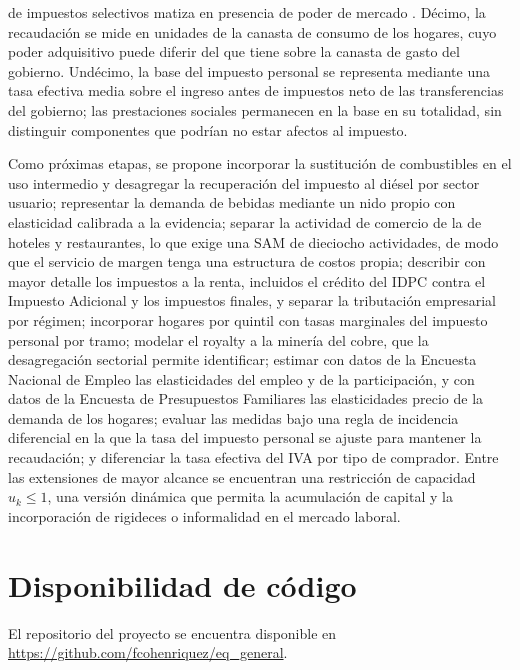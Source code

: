 \documentclass[11pt]{article}
\begin{document}
de impuestos selectivos matiza en presencia de poder de mercado \cite{delipalla_keen_1992,benedek_etal_2020}. Décimo, la recaudación se mide en unidades de la canasta de consumo de los hogares, cuyo poder adquisitivo puede diferir del que tiene sobre la canasta de gasto del gobierno. Undécimo, la base del impuesto personal se representa mediante una tasa efectiva media sobre el ingreso antes de impuestos neto de las transferencias del gobierno; las prestaciones sociales permanecen en la base en su totalidad, sin distinguir componentes que podrían no estar afectos al impuesto.

Como próximas etapas, se propone incorporar la sustitución de combustibles en el uso intermedio y desagregar la recuperación del impuesto al diésel por sector usuario; representar la demanda de bebidas mediante un nido propio con elasticidad calibrada a la evidencia; separar la actividad de comercio de la de hoteles y restaurantes, lo que exige una SAM de dieciocho actividades, de modo que el servicio de margen tenga una estructura de costos propia; describir con mayor detalle los impuestos a la renta, incluidos el crédito del IDPC contra el Impuesto Adicional y los impuestos finales, y separar la tributación empresarial por régimen; incorporar hogares por quintil con tasas marginales del impuesto personal por tramo; modelar el royalty a la minería del cobre, que la desagregación sectorial permite identificar; estimar con datos de la Encuesta Nacional de Empleo las elasticidades del empleo y de la participación, y con datos de la Encuesta de Presupuestos Familiares las elasticidades precio de la demanda de los hogares; evaluar las medidas bajo una regla de incidencia diferencial en la que la tasa del impuesto personal se ajuste para mantener la recaudación; y diferenciar la tasa efectiva del IVA por tipo de comprador. Entre las extensiones de mayor alcance se encuentran una restricción de capacidad $u_{k}\leq 1$, una versión dinámica que permita la acumulación de capital y la incorporación de rigideces o informalidad en el mercado laboral.

\section{Disponibilidad de código}

El repositorio del proyecto se encuentra disponible en \url{https://github.com/fcohenriquez/eq_general}.

\renewcommand{\refname}{Referencias}
\nocite{*}


\end{document}
